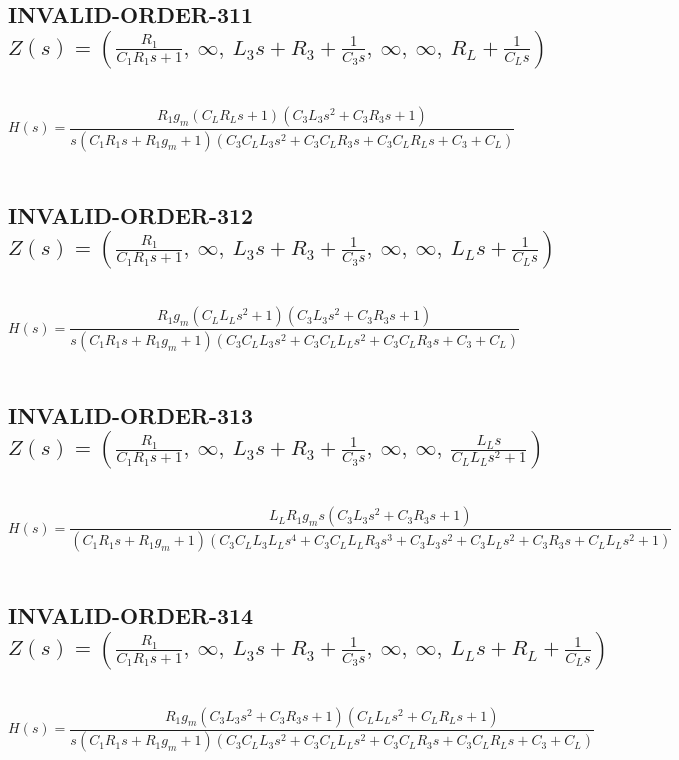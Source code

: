 \documentclass{article}
\begin{document}
\subsection{INVALID-ORDER-311 $Z(s) = \left( \frac{R_{1}}{C_{1} R_{1} s + 1}, \  \infty, \  L_{3} s + R_{3} + \frac{1}{C_{3} s}, \  \infty, \  \infty, \  R_{L} + \frac{1}{C_{L} s}\right)$ } \ 
\textbf{\[H(s) = \frac{R_{1} g_{m} \left(C_{L} R_{L} s + 1\right) \left(C_{3} L_{3} s^{2} + C_{3} R_{3} s + 1\right)}{s \left(C_{1} R_{1} s + R_{1} g_{m} + 1\right) \left(C_{3} C_{L} L_{3} s^{2} + C_{3} C_{L} R_{3} s + C_{3} C_{L} R_{L} s + C_{3} + C_{L}\right)}\] } \ 
\subsection{INVALID-ORDER-312 $Z(s) = \left( \frac{R_{1}}{C_{1} R_{1} s + 1}, \  \infty, \  L_{3} s + R_{3} + \frac{1}{C_{3} s}, \  \infty, \  \infty, \  L_{L} s + \frac{1}{C_{L} s}\right)$ } \ 
\textbf{\[H(s) = \frac{R_{1} g_{m} \left(C_{L} L_{L} s^{2} + 1\right) \left(C_{3} L_{3} s^{2} + C_{3} R_{3} s + 1\right)}{s \left(C_{1} R_{1} s + R_{1} g_{m} + 1\right) \left(C_{3} C_{L} L_{3} s^{2} + C_{3} C_{L} L_{L} s^{2} + C_{3} C_{L} R_{3} s + C_{3} + C_{L}\right)}\] } \ 
\subsection{INVALID-ORDER-313 $Z(s) = \left( \frac{R_{1}}{C_{1} R_{1} s + 1}, \  \infty, \  L_{3} s + R_{3} + \frac{1}{C_{3} s}, \  \infty, \  \infty, \  \frac{L_{L} s}{C_{L} L_{L} s^{2} + 1}\right)$ } \ 
\textbf{\[H(s) = \frac{L_{L} R_{1} g_{m} s \left(C_{3} L_{3} s^{2} + C_{3} R_{3} s + 1\right)}{\left(C_{1} R_{1} s + R_{1} g_{m} + 1\right) \left(C_{3} C_{L} L_{3} L_{L} s^{4} + C_{3} C_{L} L_{L} R_{3} s^{3} + C_{3} L_{3} s^{2} + C_{3} L_{L} s^{2} + C_{3} R_{3} s + C_{L} L_{L} s^{2} + 1\right)}\] } \ 
\subsection{INVALID-ORDER-314 $Z(s) = \left( \frac{R_{1}}{C_{1} R_{1} s + 1}, \  \infty, \  L_{3} s + R_{3} + \frac{1}{C_{3} s}, \  \infty, \  \infty, \  L_{L} s + R_{L} + \frac{1}{C_{L} s}\right)$ } \ 
\textbf{\[H(s) = \frac{R_{1} g_{m} \left(C_{3} L_{3} s^{2} + C_{3} R_{3} s + 1\right) \left(C_{L} L_{L} s^{2} + C_{L} R_{L} s + 1\right)}{s \left(C_{1} R_{1} s + R_{1} g_{m} + 1\right) \left(C_{3} C_{L} L_{3} s^{2} + C_{3} C_{L} L_{L} s^{2} + C_{3} C_{L} R_{3} s + C_{3} C_{L} R_{L} s + C_{3} + C_{L}\right)}\] } \ 
\end{document}

